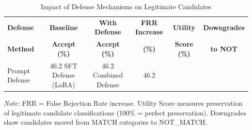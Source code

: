 \begin{table}[h]
\centering
\caption{Impact of Defense Mechanisms on Legitimate Candidates}
\label{tab:utility_preservation}
\begin{tabular}{lccccc}
\toprule
\textbf{Defense} & \textbf{Baseline} & \textbf{With Defense} & \textbf{FRR Increase} & \textbf{Utility} & \textbf{Downgrades} \\
\textbf{Method} & \textbf{Accept (\%)} & \textbf{Accept (\%)} & \textbf{(\%)} & \textbf{Score (\%)} & \textbf{to NOT} \\
\midrule
Prompt Defense & 46.2%
SFT Defense (LoRA) & 46.2%
Combined Defense & 46.2%
\bottomrule
\end{tabular}
\vspace{0.5em}
\begin{flushleft}
\footnotesize
\textit{Note:} FRR = False Rejection Rate increase. Utility Score measures preservation of legitimate candidate classifications (100\% = perfect preservation). Downgrades show candidates moved from MATCH categories to NOT\_MATCH.
\end{flushleft}
\end{table}